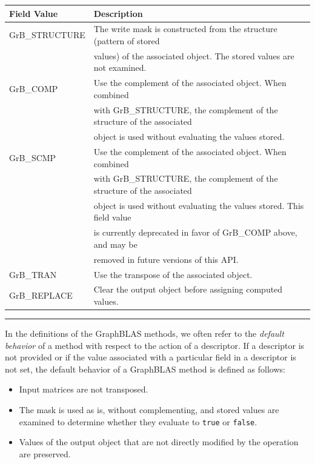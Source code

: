 \begin{table}
\begin{center}
\begin{tabular}{l|l}
Field Value          & Description \\ \hline
{\sf GrB\_STRUCTURE} &  The write mask is constructed from the structure (pattern of stored \\
                     &  values) of the associated object. The stored values are not examined.\\
{\sf GrB\_COMP}      &  Use the complement of the associated object. When combined \\ 
                     &  with {\sf GrB\_STRUCTURE}, the complement of the structure of the associated \\
                     &  object is used without evaluating the values stored.\\
{\sf GrB\_SCMP}      &  Use the complement of the associated object. When combined \\ 
                     &  with {\sf GrB\_STRUCTURE}, the complement of the structure of the associated \\
             &  object is used without evaluating the values stored. {\color{red} This field value} \\
		     &  {\color{red} is currently deprecated in favor of {\sf GrB\_COMP} above, and may be} \\
		     &  {\color{red} removed in future versions of this API.} \\
{\sf GrB\_TRAN}      &  Use the transpose of the associated object.\\
{\sf GrB\_REPLACE}   &  Clear the output object before assigning computed values.\\
\end{tabular}
\end{center}
\hrule
\end{table}

In the definitions of the GraphBLAS methods, we often refer to the
\emph{default behavior} of a method with respect to the action of a
descriptor.   If a descriptor is not provided or if the value associated
with a particular field in a descriptor is not set, the default behavior
of a GraphBLAS method is defined as follows:
\begin{itemize}
\item Input matrices are not transposed.
\item The mask is used as is, without complementing, and stored values are examined to 
determine whether they evaluate to {\tt true} or {\tt false}.

\item Values of the output object that are not directly modified by the operation are preserved.
\end{itemize}

